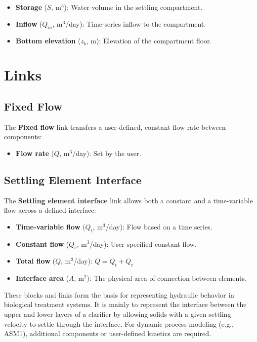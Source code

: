 \documentclass[12pt]{report}
\begin{document}
\begin{itemize}
\item \textbf{Storage} ($S$, m$^3$): Water volume in the settling compartment.
\item \textbf{Inflow} ($Q_{in}$, m$^3$/day): Time-series inflow to the compartment.
\item \textbf{Bottom elevation} ($z_b$, m): Elevation of the compartment floor.
\end{itemize}

\section{Links}
\subsection{Fixed Flow}
The \textbf{Fixed flow} link transfers a user-defined, constant flow rate between components:
\begin{itemize}
\item \textbf{Flow rate} ($Q$, m$^3$/day): Set by the user.
\end{itemize}

\subsection{Settling Element Interface}
The \textbf{Settling element interface} link allows both a constant and a time-variable flow across a defined interface:
\begin{itemize}
\item \textbf{Time-variable flow} ($Q_t$, m$^3$/day): Flow based on a time series.
\item \textbf{Constant flow} ($Q_c$, m$^3$/day): User-specified constant flow.
\item \textbf{Total flow} ($Q$, m$^3$/day): $Q = Q_t + Q_c$
\item \textbf{Interface area} ($A$, m$^2$): The physical area of connection between elements.
\end{itemize}

These blocks and links form the basis for representing hydraulic behavior in biological treatment systems. It is mainly to represent the interface between the upper and lower layers of a clarifier by allowing solids with a given settling velocity to settle through the interface. For dynamic process modeling (e.g., ASM1), additional components or user-defined kinetics are required.


\end{document}
